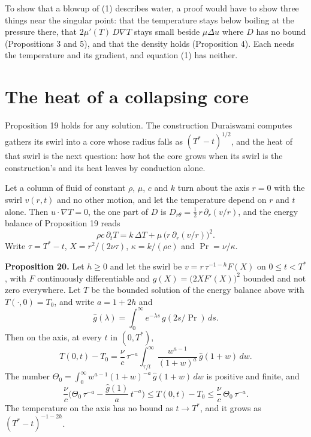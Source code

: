 To show that a blowup of (1) describes water, a proof would have to show three things near the
singular point: that the temperature stays below boiling at the pressure there, that
$2\mu'(T)\,D\nabla T$ stays small beside $\mu\Delta u$ where $D$ has no bound (Propositions 3 and
5), and that the density holds (Proposition 4). Each needs the temperature and its gradient, and
equation (1) has neither.

\section{The heat of a collapsing core}

Proposition 19 holds for any solution. The construction Duraiswami
computes~\cite{src:Duraiswami-2026} gathers its swirl into a core whose radius falls as
$(T^*-t)^{1/2}$, and the heat of that swirl is the next question: how hot the core grows when its
swirl is the construction's and its heat leaves by conduction alone.

Let a column of fluid of constant $\rho$, $\mu$, $c$ and $k$ turn about the axis $r = 0$ with the
swirl $v(r,t)$ and no other motion, and let the temperature depend on $r$ and $t$ alone. Then
$u\cdot\nabla T = 0$, the one part of $D$ is $D_{r\theta} = \tfrac12\,r\,\partial_r(v/r)$, and
the energy balance of Proposition 19 reads
\[
\rho c\,\partial_t T = k\,\Delta T + \mu\,\big(r\,\partial_r(v/r)\big)^2 .
\]
Write $\tau = T^* - t$, $X = r^2/(2\nu\tau)$, $\kappa = k/(\rho c)$ and $\Pr = \nu/\kappa$.

\textbf{Proposition 20.} Let $h \ge 0$ and let the swirl be $v = r\,\tau^{-1-h}F(X)$ on
$0 \le t < T^*$, with $F$ continuously differentiable and $g(X) = \big(2XF'(X)\big)^2$ bounded and
not zero everywhere. Let $T$ be the bounded solution of the energy balance above with
$T(\cdot,0) = T_0$, and write $a = 1 + 2h$ and
\[
\hat g(\lambda) = \int_0^\infty e^{-\lambda s}\,g(2s/\Pr)\,ds .
\]
Then on the axis, at every $t$ in $(0,T^*)$,
\[
T(0,t) - T_0 = \frac{\nu}{c}\,\tau^{-a}\int_{\tau/t}^\infty \frac{w^{a-1}}{(1+w)^a}\,
\hat g(1+w)\,dw .
\]
The number $\Theta_0 = \int_0^\infty w^{a-1}(1+w)^{-a}\,\hat g(1+w)\,dw$ is positive and finite,
and
\[
\frac{\nu}{c}\Big(\Theta_0\,\tau^{-a} - \frac{\hat g(1)}{a}\,t^{-a}\Big) \le T(0,t) - T_0
\le \frac{\nu}{c}\,\Theta_0\,\tau^{-a} .
\]
The temperature on the axis has no bound as $t \to T^*$, and it grows as $(T^*-t)^{-1-2h}$.

